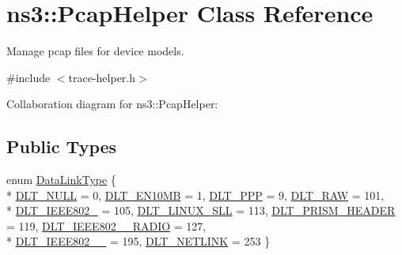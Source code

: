 \hypertarget{classns3_1_1PcapHelper}{}\section{ns3\+:\+:Pcap\+Helper Class Reference}
\label{classns3_1_1PcapHelper}


Manage pcap files for device models.  




{\ttfamily \#include $<$trace-\/helper.\+h$>$}



Collaboration diagram for ns3\+:\+:Pcap\+Helper\+:
\subsection*{Public Types}
\begin{DoxyCompactItemize}
\item 
enum \hyperlink{classns3_1_1PcapHelper_a2ee4dad28ddd9a1fe636f51835eaa77f}{Data\+Link\+Type} \{ \\*
\hyperlink{classns3_1_1PcapHelper_a2ee4dad28ddd9a1fe636f51835eaa77fada3ea118e1eb3b75b586e79542711b83}{D\+L\+T\+\_\+\+N\+U\+LL} = 0, 
\hyperlink{classns3_1_1PcapHelper_a2ee4dad28ddd9a1fe636f51835eaa77fafcc9f108717302f66800b8ea731e0ca0}{D\+L\+T\+\_\+\+E\+N10\+MB} = 1, 
\hyperlink{classns3_1_1PcapHelper_a2ee4dad28ddd9a1fe636f51835eaa77fa017d791e28f94a37b7a9e5c90bea598c}{D\+L\+T\+\_\+\+P\+PP} = 9, 
\hyperlink{classns3_1_1PcapHelper_a2ee4dad28ddd9a1fe636f51835eaa77facaa0d4a941d8f04ddafaa202c18298c1}{D\+L\+T\+\_\+\+R\+AW} = 101, 
\\*
\hyperlink{classns3_1_1PcapHelper_a2ee4dad28ddd9a1fe636f51835eaa77fa6999575ac98d2d1345c7706b9be0e192}{D\+L\+T\+\_\+\+I\+E\+E\+E802\+\_} = 105, 
\hyperlink{classns3_1_1PcapHelper_a2ee4dad28ddd9a1fe636f51835eaa77fac6e64338b3116d70944adeadf61694f9}{D\+L\+T\+\_\+\+L\+I\+N\+U\+X\+\_\+\+S\+LL} = 113, 
\hyperlink{classns3_1_1PcapHelper_a2ee4dad28ddd9a1fe636f51835eaa77faf990acee7d35df750cc18af5bf29e9d7}{D\+L\+T\+\_\+\+P\+R\+I\+S\+M\+\_\+\+H\+E\+A\+D\+ER} = 119, 
\hyperlink{classns3_1_1PcapHelper_a2ee4dad28ddd9a1fe636f51835eaa77fa186fad03d814f2abed0d6309fa9adc3f}{D\+L\+T\+\_\+\+I\+E\+E\+E802\+\_\+\_\+\+R\+A\+D\+IO} = 127, 
\\*
\hyperlink{classns3_1_1PcapHelper_a2ee4dad28ddd9a1fe636f51835eaa77faed67ae3e9cc0ee85c7cb3a8acedb3b47}{D\+L\+T\+\_\+\+I\+E\+E\+E802\+\_\+\_} = 195, 
\hyperlink{classns3_1_1PcapHelper_a2ee4dad28ddd9a1fe636f51835eaa77fa464aef67fee6c2bcb4321bec82fd337f}{D\+L\+T\+\_\+\+N\+E\+T\+L\+I\+NK} = 253
 \}
\end{DoxyCompactItemize}
